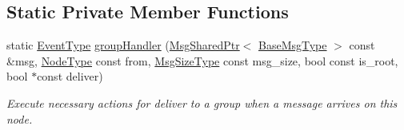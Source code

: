 \subsection*{Static Private Member Functions}
\begin{DoxyCompactItemize}
\item 
static \hyperlink{namespacevt_a009267401def7ae8bf201892222d060f}{Event\+Type} \hyperlink{structvt_1_1group_1_1_group_manager_ae0ce8441ff4ce04493ff029c2f7ba027}{group\+Handler} (\hyperlink{namespacevt_ab2b3d506ec8e8d1540aede826d84a239}{Msg\+Shared\+Ptr}$<$ \hyperlink{namespacevt_a44d0d4e144748f2b19a1cfd962f50338}{Base\+Msg\+Type} $>$ const \&msg, \hyperlink{namespacevt_a866da9d0efc19c0a1ce79e9e492f47e2}{Node\+Type} const from, \hyperlink{namespacevt_a408e86a8c7c89309b52907dc5a513924}{Msg\+Size\+Type} const msg\+\_\+size, bool const is\+\_\+root, bool $\ast$const deliver)
\begin{DoxyCompactList}\small\item\em Execute necessary actions for deliver to a group when a message arrives on this node. \end{DoxyCompactList}\end{DoxyCompactItemize}
